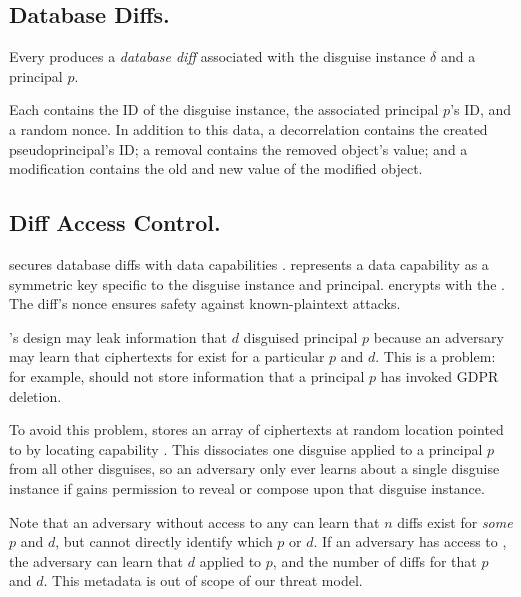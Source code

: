 \subsection{Database Diffs.}
Every  produces a \emph{database diff}  associated with the disguise instance $\delta$ and a principal $p$. 

Each  contains the ID of the disguise instance, the associated principal $p$'s ID,
and a random nonce.
%
In addition to this data, a decorrelation  contains the created pseudoprincipal's
ID; a removal  contains the removed object's value; and a modification
 contains the old and new value of the modified object.

\subsection{Diff Access Control.} 

\sys secures database diffs with data capabilities .
\sys represents a data capability  as a symmetric key specific to
the disguise instance and principal.
%
\sys encrypts  with the . The diff's nonce ensures safety against
known-plaintext attacks. 

\sys's design may leak information that $d$ disguised principal $p$ 
because an adversary may learn that ciphertexts for %
 exist for a particular $p$ and $d$.
This is a problem: for example, \sys should not store information that a principal $p$ has
invoked GDPR deletion.

To avoid this problem, \sys stores 
an array of  ciphertexts at random location pointed to by locating capability
.  This dissociates one disguise applied to a principal $p$ from all other
disguises, so an adversary only ever learns about a single disguise instance if \sys gains
permission to reveal or compose upon that disguise instance.

Note that an adversary without access to any  can learn that $n$ diffs exist for
\emph{some} $p$ and $d$, but cannot directly identify which $p$ or $d$.  If an adversary has access
to , the adversary can learn that $d$ applied to $p$, and the number of  diffs
for that $p$ and $d$. This metadata is out of scope of our threat model.

